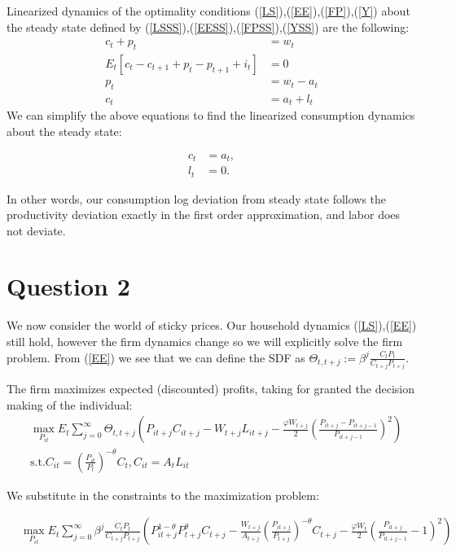 \documentclass[11pt]{article} %
\begin{document}
Linearized dynamics of the optimality conditions  (\ref{LS}),(\ref{EE}),(\ref{FP}),(\ref{Y}) about the steady state defined by  (\ref{LSSS}),(\ref{EESS}),(\ref{FPSS}),(\ref{YSS}) are the following:
\begin{align*}
c_t + p_t &= w_t\\
 E_t[c_t - c_{t+1} + p_t - p_{t+1} +i_t] &= 0 \\
p_{t} &= w_t - a_t \\
c_t &= a_t + l_t
\end{align*}
We can simplify the above equations to find the linearized consumption dynamics about the steady state:

\begin{align}
c_t &= a_t,\\
l_t &= 0.
\end{align}

In other words, our consumption log deviation from steady state follows the productivity deviation exactly in the first order approximation, and labor does not deviate.

\section{Question 2}
We now consider the world of sticky prices. Our household dynamics (\ref{LS}),(\ref{EE}) still hold, however the firm dynamics change so we will explicitly solve the firm problem. From (\ref{EE}) we see that we can define the SDF as $\Theta_{t,t+j} := \beta^j \frac{C_tP_t}{C_{t+j}P_{t+j}}$.

The firm maximizes expected (discounted) profits, taking for granted the decision making of the individual:
\begin{align*}
&\max_{P_{it}} E_t\sum_{j=0}^{\infty} \Theta_{t,t+j}\left( P_{it+j} C_{it+j} - W_{t+j}L_{it+j} - \frac{\varphi W_{t+j}}{2} \left( \frac{P_{it+j} - P_{it+j-1}}{P_{it+j-1}} \right)^2 \right)\\
&\text{s.t.} C_{it} = \left( \frac{P_{it}}{P_t} \right)^{-\theta}C_t, C_{it} = A_tL_{it}
\end{align*}

We substitute in the constraints to the maximization problem:

\begin{align*}
&\max_{P_{it}} E_t\sum_{j=0}^{\infty}  \beta^j \frac{C_tP_t}{C_{t+j}P_{t+j}}\left( P_{it+j}^{1-\theta}  P_{t+j}^{\theta}C_{t+j} - \frac{W_{t+j}}{A_{t+j}} \left( \frac{P_{it+j}}{P_{t+j}} \right)^{-\theta}C_{t+j} - \frac{\varphi W_t}{2} \left( \frac{P_{it+j}}{P_{it+j-1}} - 1 \right)^2 \right)
\end{align*}
\end{document}
